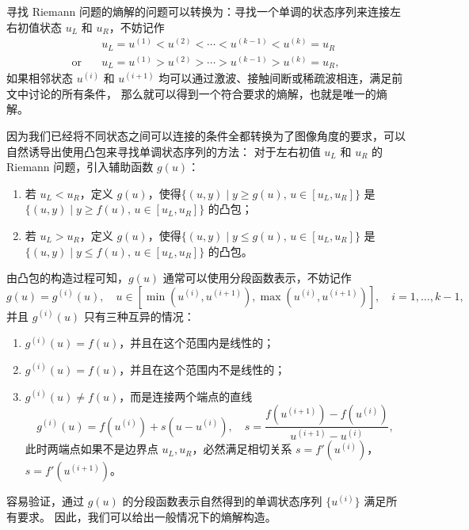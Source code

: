 寻找 Riemann 问题的熵解的问题可以转换为：寻找一个单调的状态序列来连接左右初值状态 $u_L$ 和 $u_R$，不妨记作
\begin{align*}
                   & u_L = u^{(1)} < u^{(2)} < \cdots < u^{(k-1)} < u^{(k)} = u_R \\
    \text{or}\quad & u_L = u^{(1)} > u^{(2)} > \cdots > u^{(k-1)} > u^{(k)} = u_R,
\end{align*}
如果相邻状态 $u^{(i)}$ 和 $u^{(i+1)}$ 均可以通过激波、接触间断或稀疏波相连，满足前文中讨论的所有条件，
那么就可以得到一个符合要求的熵解，也就是唯一的熵解。

因为我们已经将不同状态之间可以连接的条件全都转换为了图像角度的要求，可以自然诱导出使用凸包来寻找单调状态序列的方法：
对于左右初值 $u_L$ 和 $u_R$ 的 Riemann 问题，引入辅助函数 $g(u)$：
\begin{enumerate}
    \item 若 $u_L < u_R$，定义 $g(u)$，使得$\{ (u,y) \mid y \ge g(u),\, u \in [u_L,u_R]\}$ 是 $\{ (u,y) \mid y \ge f(u),\, u \in [u_L,u_R]\}$ 的凸包；
    \item 若 $u_L > u_R$，定义 $g(u)$，使得$\{ (u,y) \mid y \le g(u),\, u \in [u_L,u_R]\}$ 是 $\{ (u,y) \mid y \le f(u),\, u \in [u_L,u_R]\}$ 的凸包。
\end{enumerate}
由凸包的构造过程可知，$g(u)$ 通常可以使用分段函数表示，不妨记作
\[
    g(u) = g^{(i)}(u), \quad u \in [\min(u^{(i)},u^{(i+1)}),\max(u^{(i)},u^{(i+1)})],\quad i=1,\dots,k-1,
\]
并且 $g^{(i)}(u)$ 只有三种互异的情况：
\begin{enumerate}
    \item $g^{(i)}(u) = f(u)$，并且在这个范围内是线性的；
    \item $g^{(i)}(u) = f(u)$，并且在这个范围内不是线性的；
    \item $g^{(i)}(u) \neq f(u)$，而是连接两个端点的直线
          \[
              g^{(i)}(u) = f(u^{(i)}) + s(u - u^{(i)}),\quad s = \frac{f(u^{(i+1)})-f(u^{(i)})}{u^{(i+1)} - u^{(i)}},
          \]
          此时两端点如果不是边界点 $u_L,u_R$，必然满足相切关系 $s = f'(u^{(i)})$，$s = f'(u^{(i+1)})$。
\end{enumerate}
容易验证，通过 $g(u)$ 的分段函数表示自然得到的单调状态序列 $\{u^{(i)}\}$ 满足所有要求。
因此，我们可以给出一般情况下的熵解构造。
